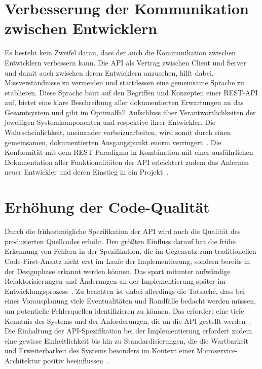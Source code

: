 \section{Verbesserung der Kommunikation zwischen Entwicklern}
Es besteht kein Zweifel daran, dass der \AFA auch die Kommunikation zwischen Entwicklern verbessern kann.
Die \ac{API} als Vertrag zwischen Client und Server und damit auch zwischen deren Entwicklern anzusehen, hilft dabei, Missverständnisse zu vermeiden und stattdessen eine gemeinsame Sprache zu etablieren. Diese Sprache baut auf den Begriffen und Konzepten einer \acs{REST}-\acs{API} auf, bietet eine klare Beschreibung aller dokumentierten Erwartungen an das Gesamtsystem und gibt im Optimalfall Aufschluss über Verantwortlichkeiten der jeweiligen Systemkomponenten und respektive ihrer Entwickler.
Die Wahrscheinlichkeit, aneinander vorbeizuarbeiten, wird somit durch einen gemeinsamen, dokumentierten Ausgangspunkt enorm verringert~\cite[1628]{cha21}.
Die Konformität mit dem \ac{REST}-Paradigma in Kombination mit einer ausführlichen Dokumentation aller Funktionalitäten der \ac{API} erleichtert zudem das Anlernen neuer Entwickler und deren Einstieg in ein Projekt~\cite[355]{de23}.

\section{Erhöhung der Code-Qualität}
Durch die frühestmögliche Spezifikation der \ac{API} wird auch die Qualität des produzierten Quellcodes erhöht.
Den größten Einfluss darauf hat die frühe Erkennung von Fehlern in der Spezifikation, die im Gegensatz zum traditionellen Code-First-Ansatz nicht erst im Laufe der Implementierung, sondern bereits in der Designphase erkannt werden können.
Das spart mitunter aufwändige Refaktorisierungen und Änderungen an der Implementierung später im Entwicklungsprozess~\cite{vol22}.
Zu beachten ist dabei allerdings die Tatsache, dass bei einer Vorausplanung viele Eventualitäten und Randfälle bedacht werden müssen, um potentielle Fehlerquellen identifizieren zu können. Das erfordert eine tiefe Kenntnis des Systems und der Anforderungen, die an die \ac{API} gestellt werden~\cite[362]{de23}. %
Die Einhaltung der \ac{API}-Spezifikation bei der Implementierung erfordert zudem eine gewisse Einheitlichkeit bis hin zu Standardisierungen, die die Wartbarkeit und Erweiterbarkeit des Systems besonders im Kontext einer Microservice-Architektur positiv beeinflussen~\cite[1628]{cha21}.